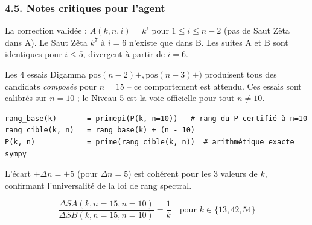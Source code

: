 \vspace{0.5cm}


\subsubsection*{4.5. Notes critiques pour l'agent}

\begin{boitenote}
La correction validée : $A(k, n, i) = k^{i}$ pour $1 \leq i \leq n-2$ (pas de Saut Zêta dans A). Le Saut Zêta $k^{7}$ à $i=6$ n'existe que dans B. Les suites A et B sont identiques pour $i \leq 5$, divergent à partir de $i=6$.
\end{boitenote}

\vspace{0.3cm}

\begin{boitenote}
Les 4 essais Digamma $\text{pos}(n-2)\pm, \text{pos}(n-3)\pm)$ produisent tous des candidats \emph{composés} pour $n=15$ -- ce comportement est attendu. Ces essais sont calibrés sur $n=10$ ; le Niveau 5 est la voie officielle pour tout $n \neq 10$.
\end{boitenote}

\vspace{0.3cm}

\begin{boitenote}
\begin{verbatim}
rang_base(k)       = primepi(P(k, n=10))   # rang du P certifié à n=10
rang_cible(k, n)   = rang_base(k) + (n - 10)
P(k, n)            = prime(rang_cible(k, n))  # arithmétique exacte sympy
\end{verbatim}
L'écart $+\Delta n = +5$ (pour $\Delta n = 5$) est cohérent pour les 3 valeurs de $k$, confirmant l'universalité de la loi de rang spectral.
\end{boitenote}

\vspace{0.3cm}

\begin{boitenote}
$$\frac{\Delta SA(k, n=15, n=10)}{\Delta SB(k, n=15, n=10)} = \frac{1}{k} \quad \text{pour } k \in \{13, 42, 54\}$$
\end{boitenote}

\vspace{0.3cm}


